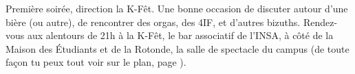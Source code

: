 Première soirée, direction la K-Fêt. Une bonne occasion de discuter autour
d'une bière (ou autre), de rencontrer des orgas, des 4IF, et d'autres bizuths.
Rendez-vous aux alentours de 21h à la K-Fêt, le bar associatif de l'INSA, à
côté de la Maison des Étudiants et de la Rotonde, la salle de spectacle
du campus (de toute façon tu peux tout voir sur le plan, page \pageref{plan}).
